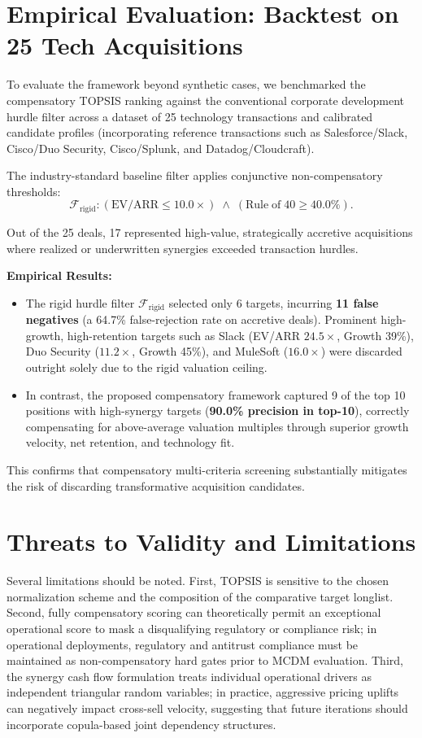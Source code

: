 \documentclass[conference]{IEEEtran}
\begin{document}
\section{Empirical Evaluation: Backtest on 25 Tech Acquisitions}
To evaluate the framework beyond synthetic cases, we benchmarked the compensatory TOPSIS ranking against the conventional corporate development hurdle filter across a dataset of 25 technology transactions and calibrated candidate profiles (incorporating reference transactions such as Salesforce/Slack, Cisco/Duo Security, Cisco/Splunk, and Datadog/Cloudcraft).

The industry-standard baseline filter applies conjunctive non-compensatory thresholds:
\begin{equation}
\mathcal{F}_{\text{rigid}}: (\mathrm{EV/ARR} \le 10.0\times) \;\land\; (\mathrm{Rule\;of\;40} \ge 40.0\%).
\end{equation}

Out of the 25 deals, 17 represented high-value, strategically accretive acquisitions where realized or underwritten synergies exceeded transaction hurdles. 

\textbf{Empirical Results:}
\begin{itemize}
    \item The rigid hurdle filter $\mathcal{F}_{\text{rigid}}$ selected only 6 targets, incurring \textbf{11 false negatives} (a 64.7\% false-rejection rate on accretive deals). Prominent high-growth, high-retention targets such as Slack (EV/ARR $24.5\times$, Growth 39\%), Duo Security ($11.2\times$, Growth 45\%), and MuleSoft ($16.0\times$) were discarded outright solely due to the rigid valuation ceiling.
    \item In contrast, the proposed compensatory framework captured 9 of the top 10 positions with high-synergy targets (\textbf{90.0\% precision in top-10}), correctly compensating for above-average valuation multiples through superior growth velocity, net retention, and technology fit.
\end{itemize}

This confirms that compensatory multi-criteria screening substantially mitigates the risk of discarding transformative acquisition candidates.

\section{Threats to Validity and Limitations}
Several limitations should be noted. First, TOPSIS is sensitive to the chosen normalization scheme and the composition of the comparative target longlist. Second, fully compensatory scoring can theoretically permit an exceptional operational score to mask a disqualifying regulatory or compliance risk; in operational deployments, regulatory and antitrust compliance must be maintained as non-compensatory hard gates prior to MCDM evaluation. Third, the synergy cash flow formulation treats individual operational drivers as independent triangular random variables; in practice, aggressive pricing uplifts can negatively impact cross-sell velocity, suggesting that future iterations should incorporate copula-based joint dependency structures.
\end{document}
